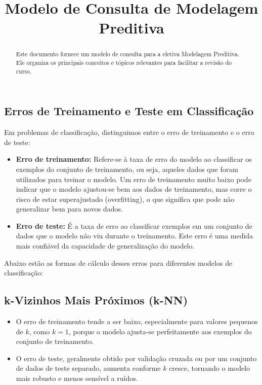 \documentclass{sciposter}
\title{Modelo de Consulta de Modelagem Preditiva}
\institute 
{Bacharelado em Economia\\
Insper - Instituto de Ensino e Pesquisa\\
São Paulo, Brasil}
\begin{document}

\maketitle

\begin{multicols}{3}

\begin{abstract}
Este documento fornece um modelo de consulta para a eletiva Modelagem Preditiva. Ele organiza os principais conceitos e tópicos relevantes para facilitar a revisão do curso.
\end{abstract}



\section{Erros de Treinamento e Teste em Classificação}

Em problemas de classificação, distinguimos entre o erro de treinamento e o erro de teste:

\begin{itemize}
    \item \textbf{Erro de treinamento:} Refere-se à taxa de erro do modelo ao classificar os exemplos do conjunto de treinamento, ou seja, aqueles dados que foram utilizados para treinar o modelo. Um erro de treinamento muito baixo pode indicar que o modelo ajustou-se bem aos dados de treinamento, mas corre o risco de estar superajustado (overfitting), o que significa que pode não generalizar bem para novos dados.
    
    \item \textbf{Erro de teste:} É a taxa de erro ao classificar exemplos em um conjunto de dados que o modelo não viu durante o treinamento. Este erro é uma medida mais confiável da capacidade de generalização do modelo.
\end{itemize}

Abaixo estão as formas de cálculo desses erros para diferentes modelos de classificação:

\subsection{k-Vizinhos Mais Próximos (k-NN)}
\begin{itemize}
    \item O erro de treinamento tende a ser baixo, especialmente para valores pequenos de \(k\), como \(k=1\), porque o modelo ajusta-se perfeitamente aos exemplos do conjunto de treinamento.
    \item O erro de teste, geralmente obtido por validação cruzada ou por um conjunto de dados de teste separado, aumenta conforme \(k\) cresce, tornando o modelo mais robusto e menos sensível a ruídos.
\end{itemize}


\end{multicols}
\end{document}
